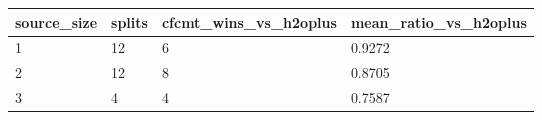 \begin{tabular}{llll}
\toprule
source\_size & splits & cfcmt\_wins\_vs\_h2oplus & mean\_ratio\_vs\_h2oplus \\
\midrule
1 & 12 & 6 & 0.9272 \\
2 & 12 & 8 & 0.8705 \\
3 & 4 & 4 & 0.7587 \\
\bottomrule
\end{tabular}

